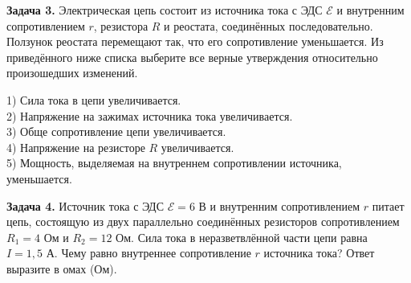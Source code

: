 \begin{taskbasic}[code={\label{task:elem_circ_v15_n14}}]
\textbf{Задача 3.} Электрическая цепь состоит из источника тока с ЭДС $\mathcal{E}$ и внутренним сопротивлением $r$, резистора $R$ и реостата, соединённых последовательно. Ползунок реостата перемещают так, что его сопротивление уменьшается. Из приведённого ниже списка выберите все верные утверждения относительно произошедших изменений.

\nopagebreak\smallskip
\begin{center}
\end{center}

1) Сила тока в цепи увеличивается.\\
2) Напряжение на зажимах источника тока увеличивается.\\
3) Обще сопротивление цепи увеличивается.\\
4) Напряжение на резисторе $R$ увеличивается.\\
5) Мощность, выделяемая на внутреннем сопротивлении источника, уменьшается.

\end{taskbasic}

\begin{taskbasic}[code={\label{task:elem_circ_v16_n25}}]
\textbf{Задача 4.} Источник тока с ЭДС $\mathcal{E} = 6\text{ В}$ и внутренним сопротивлением $r$ питает цепь, состоящую из двух параллельно соединённых резисторов сопротивлением $R_1 = 4\text{ Ом}$ и $R_2 = 12\text{ Ом}$. Сила тока в неразветвлённой части цепи равна $I = 1{,}5\text{ А}$. Чему равно внутреннее сопротивление $r$ источника тока? Ответ выразите в омах (Ом).

\end{taskbasic}


